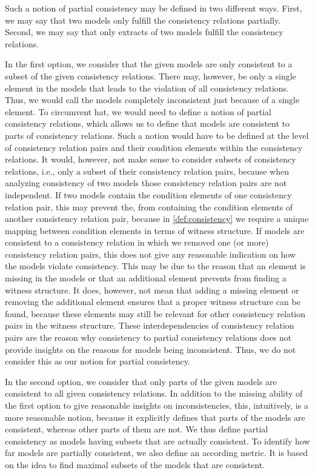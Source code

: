 Such a notion of partial consistency may be defined in two different ways.
First, we may say that two models only fulfill the consistency relations partially.
Second, we may say that only extracts of two models fulfill the consistency relations.

In the first option, we consider that the given models are only consistent to a subset of the given consistency relations.
There may, however, be only a single element in the models that leads to the violation of all consistency relations.
Thus, we would call the models completely inconsistent just because of a single element.
To circumvent hat, we would need to define a notion of partial consistency relations, which allows us to define that models are consistent to parts of consistency relations.
Such a notion would have to be defined at the level of consistency relation pairs and their condition elements within the consistency relations.
It would, however, not make sense to consider subsets of consistency relations, i.e., only a subset of their consistency relation pairs, because when analyzing consistency of two models those consistency relation pairs are not independent.
If two models contain the condition elements of one consistency relation pair, this may prevent the, from containing the condition elements of another consistency relation pair, because in \autoref{def:consistency} we require a unique mapping between condition elements in terms of witness structure.
If models are consistent to a consistency relation in which we removed one (or more) consistency relation pairs, this does not give any reasonable indication on how the models violate consistency.
This may be due to the reason that an element is missing in the models or that an additional element prevents from finding a witness structure.
It does, however, not mean that adding a missing element or removing the additional element ensures that a proper witness structure can be found, because these elements may still be relevant for other consistency relation pairs in the witness structure.
These interdependencies of consistency relation pairs are the reason why consistency to partial consistency relations does not provide insights on the reasons for models being inconsistent.
Thus, we do not consider this as our notion for partial consistency.

In the second option, we consider that only parts of the given models are consistent to all given consistency relations.
In addition to the missing ability of the first option to give reasonable insights on inconsistencies, this, intuitively, is a more reasonable notion, because it explicitly defines that parts of the models are consistent, whereas other parts of them are not.
We thus define partial consistency as models having subsets that are actually consistent.
To identify how far models are partially consistent, we also define an according metric.
It is based on the idea to find maximal subsets of the models that are consistent.

